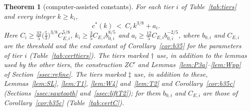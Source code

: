 \documentclass[11pt]{amsart}
\newcommand{\cs}{c^{*}}
\newtheorem{theorem}{Theorem}[section]
\theoremstyle{definition}
\theoremstyle{remark}
\numberwithin{equation}{section}
\begin{document}
\begin{theorem}[computer-assisted constants]\label{thm:main38}
For each tier $i$ of Table~\ref{tab:tiers} and every integer $k\ge k_i$,
\[
\cs(k)\ <\ C_i\,k^{3/8}+a_i .
\]
Here $C_i\ge\frac{32}{5}\bigl(\frac53\bigr)^{3/8}C_{E,i}^{5/8}$, $k_i\ge\frac35C_{E,i}b_{0,i}^{8/5}$ and
$a_i\ge\frac{12}5C_{E,i}b_{0,i}^{-2/5}$, where $b_{0,i}$ and $C_{E,i}$ are the threshold and the end constant of
Corollary~\ref{cor:b35} for the parameters of tier $i$ (Table~\ref{tab:certtiers}).
The tiers marked $\dagger$ use, in addition to the lemmas used by the other tiers, the construction ZC$'$ and
Lemmas~\ref{lem:P3a}--\ref{lem:Wpp} of Section~\ref{ssec:refine}.
The tiers marked $\ddagger$ use, in addition to these, Lemmas~\ref{lem:SL}, \ref{lem:T1}, \ref{lem:W4} and~\ref{lem:T2}
and Corollary~\ref{cor:b35c} (Sections~\ref{ssec:sawtooth} and~\ref{ssec:liftT2}); for them \(b_{0,i}\) and \(C_{E,i}\) are those of Corollary~\ref{cor:b35c} (Table~\ref{tab:certC}).
\end{theorem}
\end{document}

